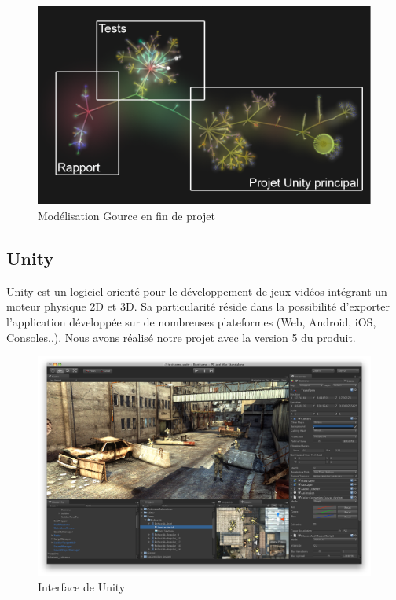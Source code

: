 \begin{figure}[H]\centering
  \includegraphics[scale=.3]{./img/gource_over.png}
  \caption{Modélisation Gource en fin de projet}
  \label{gource_over}
\end{figure}
 

\subsection{Unity}

Unity est un logiciel orienté pour le développement de jeux-vidéos intégrant un moteur physique 2D et 3D. Sa particularité réside dans la possibilité d'exporter l'application développée sur de nombreuses plateformes (Web, Android, iOS, Consoles..). Nous avons réalisé notre projet avec la version 5 du produit.


\begin{figure}[H]\centering
  \includegraphics[scale=.28]{./img/unity-3D.png}
  \caption{Interface de Unity}
  \label{unity}
\end{figure}

